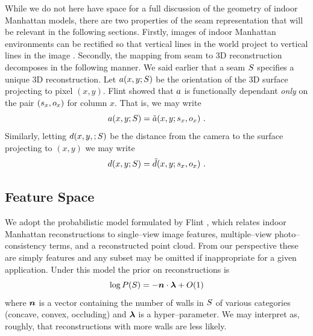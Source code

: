 While we do not here have space for a full discussion of the geometry
of indoor Manhattan models, there are two properties of the seam
representation that will be relevant in the following
sections. Firstly, images of indoor Manhattan environments can be
rectified so that vertical lines in the world project to vertical
lines in the image \cite{Flint10eccv}. Secondly, the mapping from seam
to 3D reconstruction decomposes in the following manner. We said
earlier that a seam $S$ specifies a unique 3D reconstruction. Let
$a(x,y;S)$ be the orientation of the 3D
surface projecting to pixel $(x,y)$. Flint \etal \cite{Flint10eccv}
showed that $a$ is functionally dependant \textit{only} on the
pair $(s_x,o_x)$ for column $x$. That is, we may write
\begin{equation}
  \label{eq:orient-indep}
  a(x,y;S) = \tilde{a}(x,y;s_x,o_x) ~.
\end{equation}
Similarly, letting $d(x,y,;S)$ be the distance from the
camera to the surface projecting to $(x,y)$ we may write
\begin{equation}
  \label{eq:depth-indep}
  d(x,y;S) = \tilde{d}(x,y;s_x,o_x) ~.
\end{equation}

\subsection{Feature Space}

We adopt the probabilistic model formulated by Flint \etal
\cite{Flint11}, which relates indoor Manhattan reconstructions to
single--view image features, multiple--view photo--consistency terms,
and a reconstructed point cloud. From our perspective these are simply
features and any subset may be omitted if inappropriate for a given
application. Under this model the prior on reconstructions is
\begin{equation}
  \log P(S) = - \boldsymbol{n} \cdot \boldsymbol{\lambda} + O(1)
  \label{eq:prior}
\end{equation}
where $\boldsymbol{n}$ is a vector containing the number of walls in $S$
of various categories (concave, convex, occluding) and $\boldsymbol{\lambda}$ is
a hyper--parameter. We may interpret  as,
roughly, that reconstructions with more walls are less likely.

